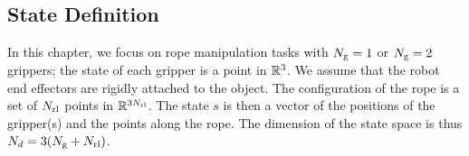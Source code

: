 \subsection{State Definition}

In this chapter, we focus on rope manipulation tasks with $N_\text{g}=1$ or $N_\text{g}=2$ grippers; the state of each gripper is a point in $\mathbb{R}^3$. We assume that the robot end effectors are rigidly attached to the object. The configuration of the rope is a set of $N_\text{rl}$ points in $\mathbb{R}^{3N_\text{rl}}$. The state $s$ is then a vector of the positions of the gripper(s) and the points along the rope. The dimension of the state space is thus $N_d = 3 (N_\text{g} + N_\text{rl} )$.

